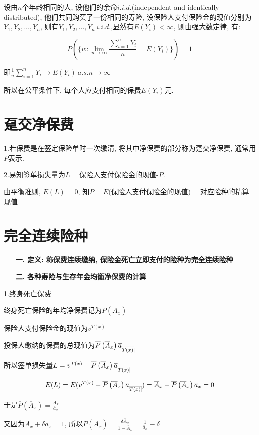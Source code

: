 \documentclass[a4paper,10pt]{ctexbook}
\makeatletter
\newcommand{\hei}{\CJKfamily{hei}}      %
\DeclareRobustCommand{\annu}[1]{_{%
    \def\arraystretch{0}%
    \setlength\arraycolsep{1pt}%
    \setlength\arrayrulewidth{.2pt}%
    \begin{array}[b]{@{}c|}\hline
        \\[\arraycolsep]%
        \scriptstyle #1%
    \end{array}%
}}
\makeatother
\begin{document}
设由$n$个年龄相同的人, 设他们的余命$i.i.d.$(independent and identically distributed), 他们共同购买了一份相同的寿险, 设保险人支付保险金的现值分别为$Y_1,Y_2,...,Y_n$, 则有$Y_1,Y_2,...,Y_n~i.i.d.$,显然有$E(Y_i)<\infty$, 则由强大数定律, 有:

$$P(\{w:\underset{n\rightarrow \infty}{\lim}\frac{\sum_{i=1}^{n}{Y_i}}{n}=E(Y_i)\})=1$$

即$\frac{1}{n}\sum_{i=1}^n{Y_i}\rightarrow E(Y_i) ~a.s.n\rightarrow\infty$

所以在公平条件下, 每个人应支付相同的保费$E(Y_i)$元.
\section{趸交净保费}
1.若保费是在签定保险单时一次缴清, 将其中净保费的部分称为趸交净保费, 通常用$P$表示.

2.易知签单损失量为$L=$保险人支付保险金的现值-$P$.

由平衡准则, $E(L)=0$, 知$P=E($保险人支付保险金的现值$)=$对应险种的精算现值


\section{完全连续险种}
\begin{itemize}
    \item[{\bf\hei 一.}]{\bf\hei 定义: 称保费连续缴纳, 保险金死亡立即支付的险种为完全连续险种}
\end{itemize}
\begin{itemize}
    \item[{\bf\hei 二.}]{\bf\hei 各种寿险与生存年金均衡净保费的计算}
\end{itemize}
1.终身死亡保费

终身死亡保险的年均净保费记为$\overline{P}\left( \overline{A}_x \right)$

保险人支付保险金的现值为$v^{T(x)}$

投保人缴纳的保费的总现值为$\overline{P}\left( \overline{A}_x \right)\overline a_{\annu {T(x)}}$

所以签单损失量$L=v^{T(x)}-\overline{P}\left( \overline{A}_x \right)\overline a_{\annu {T(x)}}$

$$E(L)=E(v^{T(x)}-\overline{P}\left( \overline{A}_x \right)\overline a_{\annu {T(x)}})=\overline A_x-\overline{P}\left( \overline{A}_x \right)\overline a_{x}=0$$

于是$\overline{P}\left( \overline{A}_x \right)=\frac{\overline A_x}{\overline a_x}$

又因为$\overline A_x+\delta \overline a_x=1$, 所以$\overline{P}\left( \overline{A}_x \right)=\frac{\delta\overline A_x}{1-\overline A_x}=\frac{1}{\overline a_x}-\delta$
\end{document}
